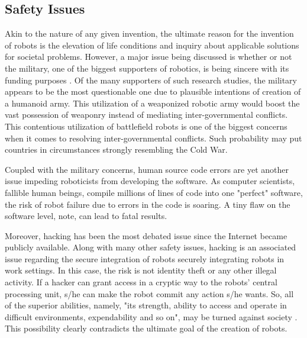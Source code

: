 \documentclass[man]{apa6}
\begin{document}
\subsection{Safety Issues}
Akin to the nature of any given invention, the ultimate reason for the invention of robots is the elevation of life conditions and inquiry about applicable solutions for societal problems.
However, a major issue being discussed is whether or not the military, one of the biggest supporters of robotics, is being sincere with its funding purposes \cite{gre}.
Of the many supporters of such research studies, the military appears to be the most questionable one due to plausible intentions of creation of a humanoid army.
This utilization of a weaponized robotic army would boost the vast possession of weaponry instead of mediating inter-governmental conflicts.
This contentious utilization of battlefield robots is one of the biggest concerns when it comes to resolving inter-governmental conflicts.
Such probability may put countries in circumstances strongly resembling the Cold War. \par

Coupled with the military concerns, human source code errors are yet another issue impeding roboticists from developing the software.
As computer scientists, fallible human beings, compile millions of lines of code into one "perfect" software, the risk of robot failure due to errors in the code is soaring.
A tiny flaw on the software level,  note, can lead to fatal results. 

Moreover, hacking has been the most debated issue since the Internet became publicly available.
Along with many other safety issues, hacking is an associated issue regarding the secure integration of robots securely integrating robots in work settings.
In this case, the risk is not identity theft or any other illegal activity. %
If a hacker can grant access in a cryptic way to the robots' central processing unit, s/he can make the robot commit any action s/he wants.
So, all of the superior abilities, namely, "its strength, ability to access and operate in difficult environments, expendability and so on", may be turned against society \cite[p.~945]{lin}.
This possibility clearly contradicts the ultimate goal of the creation of robots.
\end{document}

